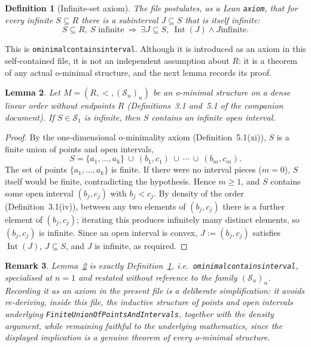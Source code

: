 \documentclass[11pt]{article}
\newtheorem{definition}{Definition}[section]
\newtheorem{lemma}[definition]{Lemma}
\newtheorem{remark}[definition]{Remark}
\newcommand{\Sfam}{\mathcal S}
\newcommand{\Lean}[1]{\texttt{\begingroup\def\_{\textunderscore\discretionary{}{}{}}#1\endgroup}}
\newcommand{\Int}{\operatorname{Int}}
\begin{document}
\begin{definition}[Infinite-set axiom]\label{def:omin-axiom}
The file postulates, as a Lean \Lean{axiom}, that for every infinite $S\subseteq R$ there is a
subinterval $J\subseteq S$ that is itself infinite:
\[
  S\subseteq R,\ S\text{ infinite}\ \Longrightarrow\ \exists J\subseteq S,\ \Int(J)\wedge J\text{
  infinite}.
\]
\end{definition}
 
This is \Lean{o\_minimal\_contains\_interval}. Although it is introduced as an axiom in this
self-contained file, it is not an independent assumption about $R$: it is a theorem of any actual
o-minimal structure, and the next lemma records its proof.
 
\begin{lemma}\label{lem:omin-derivation}
Let $M=(R,<,(\Sfam_n)_{n})$ be an o-minimal structure on a dense linear order without endpoints
$R$ (Definitions~3.1 and~5.1 of the companion document). If $S\in\Sfam_1$ is infinite, then $S$
contains an infinite open interval.
\end{lemma}
 
\begin{proof}
By the one-dimensional o-minimality axiom (Definition~5.1(xi)), $S$ is a finite union of points
and open intervals,
\[
  S = \{a_1,\dots,a_k\}\ \cup\ (b_1,c_1)\ \cup\ \cdots\ \cup\ (b_m,c_m).
\]
The set of points $\{a_1,\dots,a_k\}$ is finite. If there were no interval pieces ($m=0$), $S$
itself would be finite, contradicting the hypothesis. Hence $m\ge1$, and $S$ contains some open
interval $(b_j,c_j)$ with $b_j<c_j$. By density of the order (Definition~3.1(iv)), between any two
elements of $(b_j,c_j)$ there is a further element of $(b_j,c_j)$; iterating this produces
infinitely many distinct elements, so $(b_j,c_j)$ is infinite. Since an open interval is convex,
$J:=(b_j,c_j)$ satisfies $\Int(J)$, $J\subseteq S$, and $J$ is infinite, as required.
\end{proof}
 
\begin{remark}
Lemma~\ref{lem:omin-derivation} is exactly Definition~\ref{def:omin-axiom}, i.e.\
\Lean{o\_minimal\_contains\_interval}, specialised at $n=1$ and restated without reference to the
family $(\Sfam_n)_n$. Recording it as an axiom in the present file is a deliberate simplification:
it avoids re-deriving, inside this file, the inductive structure of points and open intervals
underlying \Lean{Finite\discretionary{}{}{}Union\discretionary{}{}{}Of\discretionary{}{}{}Points\discretionary{}{}{}AndIntervals},
together with the density argument, while
remaining faithful to the underlying mathematics, since the displayed implication is a genuine
theorem of every o-minimal structure.
\end{remark}
 
\end{document}
